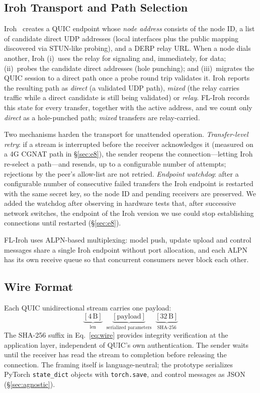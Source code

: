 \documentclass[a4paper,fleqn]{cas-dc}
\begin{document}
\subsection{Iroh Transport and Path Selection}
\label{sec:transport}

Iroh~\cite{iroh2024} creates a QUIC endpoint whose \emph{node address} consists of the node ID, a list of candidate direct UDP addresses (local interfaces plus the public mapping discovered via STUN-like probing), and a DERP relay URL. When a node dials another, Iroh (i)~uses the relay for signaling and, immediately, for data; (ii)~probes the candidate direct addresses (hole punching); and (iii)~migrates the QUIC session to a direct path once a probe round trip validates it. Iroh reports the resulting path as \emph{direct} (a validated UDP path), \emph{mixed} (the relay carries traffic while a direct candidate is still being validated) or \emph{relay}. FL-Iroh records this state for every transfer, together with the active address, and we count only \emph{direct} as a hole-punched path; \emph{mixed} transfers are relay-carried.

Two mechanisms harden the transport for unattended operation. \emph{Transfer-level retry}: if a stream is interrupted before the receiver acknowledges it (measured on a 4G CGNAT path in \S\ref{sec:e8}), the sender reopens the connection---letting Iroh re-select a path---and resends, up to a configurable number of attempts; rejections by the peer's allow-list are not retried. \emph{Endpoint watchdog}: after a configurable number of consecutive failed transfers the Iroh endpoint is restarted with the same secret key, so the node ID and pending receivers are preserved. We added the watchdog after observing in hardware tests that, after successive network switches, the endpoint of the Iroh version we use could stop establishing connections until restarted (\S\ref{sec:e8}).

FL-Iroh uses ALPN-based multiplexing: model push, update upload and control messages share a single Iroh endpoint without port allocation, and each ALPN has its own receive queue so that concurrent consumers never block each other.

\subsection{Wire Format}
\label{sec:wire}

Each QUIC unidirectional stream carries one payload:
\begin{equation}
\underbrace{[4\,\text{B}]}_{\text{len}} \;\; \underbrace{[\text{payload}]}_{\text{serialized parameters}} \;\; \underbrace{[32\,\text{B}]}_{\text{SHA-256}}
\label{eq:wire}
\end{equation}
The SHA-256 suffix in Eq.~\eqref{eq:wire} provides integrity verification at the application layer, independent of QUIC's own authentication. The sender waits until the receiver has read the stream to completion before releasing the connection. The framing itself is language-neutral; the prototype serializes PyTorch \texttt{state\_dict} objects with \texttt{torch.save}, and control messages as JSON (\S\ref{sec:agnostic}).
\end{document}

